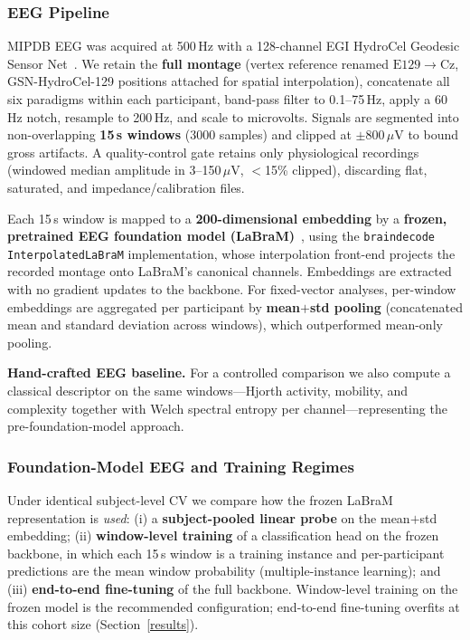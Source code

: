 \subsubsection{EEG Pipeline}
\label{sec:eegpipe}
MIPDB EEG was acquired at 500\,Hz with a 128-channel EGI HydroCel Geodesic Sensor
Net~\cite{Langer2017}. We retain the \textbf{full montage} (vertex reference renamed
$\mathrm{E129}\!\to\!\mathrm{Cz}$, GSN-HydroCel-129 positions attached for spatial
interpolation), concatenate all six paradigms within each participant, band-pass
filter to 0.1--75\,Hz, apply a 60\,Hz notch, resample to 200\,Hz, and scale to
microvolts. Signals are segmented into non-overlapping \textbf{15\,s windows}
(3000 samples) and clipped at $\pm 800\,\mu$V to bound gross artifacts. A
quality-control gate retains only physiological recordings (windowed median
amplitude in 3--150\,$\mu$V, $<$15\% clipped), discarding flat, saturated, and
impedance/calibration files.

Each 15\,s window is mapped to a \textbf{200-dimensional embedding} by a
\textbf{frozen, pretrained EEG foundation model (LaBraM)}~\cite{LaBraM2024}, using
the \texttt{braindecode} \texttt{InterpolatedLaBraM} implementation, whose
interpolation front-end projects the recorded montage onto LaBraM's canonical
channels. Embeddings are extracted with no gradient updates to the backbone. For
fixed-vector analyses, per-window embeddings are aggregated per participant by
\textbf{mean$+$std pooling} (concatenated mean and standard deviation across
windows), which outperformed mean-only pooling.

\textbf{Hand-crafted EEG baseline.} For a controlled comparison we also compute a
classical descriptor on the same windows---Hjorth activity, mobility, and complexity
together with Welch spectral entropy per channel---representing the
pre-foundation-model approach.

\subsubsection{Foundation-Model EEG and Training Regimes}
\label{sec:regimes}
Under identical subject-level CV we compare how the frozen LaBraM representation is
\emph{used}: (i) a \textbf{subject-pooled linear probe} on the mean$+$std embedding;
(ii) \textbf{window-level training} of a classification head on the frozen backbone,
in which each 15\,s window is a training instance and per-participant predictions are
the mean window probability (multiple-instance learning); and (iii) \textbf{end-to-end
fine-tuning} of the full backbone. Window-level training on the frozen model is the
recommended configuration; end-to-end fine-tuning overfits at this cohort size
(Section~\ref{results}).

